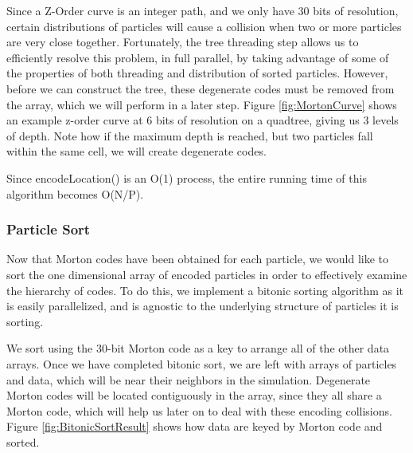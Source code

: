 \documentclass{thesis}
\begin{document}
Since a Z-Order curve is an integer path, and we only have 30 bits of resolution, certain distributions of particles will cause a collision when two or more particles are very close together. Fortunately, the tree threading step allows us to efficiently resolve this problem, in full parallel, by taking advantage of some of the properties of both threading and distribution of sorted particles. However, before we can construct the tree, these degenerate codes must be removed from the array, which we will perform in a later step. Figure \ref{fig:MortonCurve} shows an example z-order curve at 6 bits of resolution on a quadtree, giving us 3 levels of depth. Note how if the maximum depth is reached, but two particles fall within the same cell, we will create degenerate codes.

Since encodeLocation() is an O(1) process, the entire running time of this algorithm becomes O(N/P).


\subsubsection{Particle Sort}
Now that  Morton codes have been obtained for each particle, we would like to sort the one dimensional array of encoded particles in order to effectively examine the hierarchy of codes. To do this, we implement a bitonic sorting algorithm as it is easily parallelized, and is agnostic to the underlying structure of particles it is sorting.

We sort using the 30-bit  Morton code as a key to arrange all of the other data arrays. Once we have completed bitonic sort, we are left with arrays of particles and data, which will be near their neighbors in the simulation. Degenerate  Morton codes will be located contiguously in the array, since they all share a  Morton code, which will help us later on to deal with these encoding collisions. Figure \ref{fig:BitonicSortResult} shows how data are keyed by  Morton code and sorted.

\end{document}
